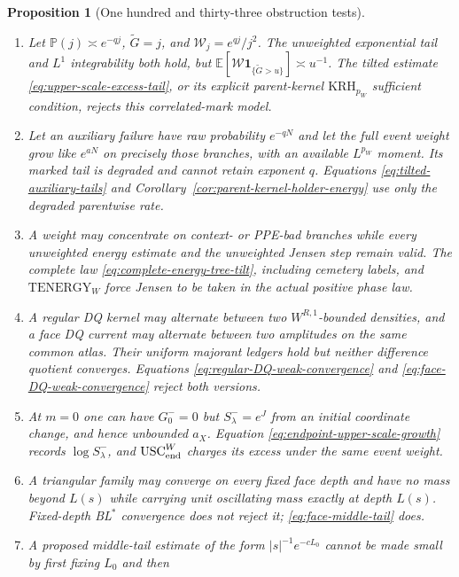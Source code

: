 \documentclass[11pt]{article}
\newtheorem{proposition}[theorem]{Proposition}
\newcommand{\one}{\mathbf 1}
\begin{document}
\begin{proposition}[One hundred and thirty-three obstruction tests]
\begin{enumerate}[label=\textup{(T\arabic*)}]
      minimum \eqref{eq:complete-phase-exponent} return the correct smaller
      exponent without applying a second square root.
\item Let $\mathbb P(j)\asymp e^{-qj}$,
      $\widetilde G=j$, and $\mathscr W_j=e^{qj}/j^2$.  The unweighted
      exponential tail and $L^1$ integrability both hold, but
      $\mathbb E[\mathscr W\one_{\{\widetilde G>u\}}]\asymp u^{-1}$.
      The tilted estimate \eqref{eq:upper-scale-excess-tail}, or its explicit
      parent-kernel $\mathrm{KRH}_{p_W}$ sufficient condition, rejects this
      correlated-mark model.
\item Let an auxiliary failure have raw probability $e^{-qN}$ and let the
      full event weight grow like $e^{aN}$ on precisely those branches, with
      an available $L^{p_W}$ moment.  Its marked tail is degraded and cannot
      retain exponent $q$.  Equations
      \eqref{eq:tilted-auxiliary-tails} and
      Corollary~\ref{cor:parent-kernel-holder-energy} use only the degraded
      parentwise rate.
\item A weight may concentrate on context- or PPE-bad branches while every
      unweighted energy estimate and the unweighted Jensen step remain
      valid.  The complete law \eqref{eq:complete-energy-tree-tilt}, including
      cemetery labels, and $\mathrm{TENERGY}_{W}$ force Jensen to be taken in
      the actual positive phase law.
\item A regular DQ kernel may alternate between two
      $W^{R,1}$-bounded densities, and a face DQ current may alternate between
      two amplitudes on the same common atlas.  Their uniform majorant ledgers
      hold but neither difference quotient converges.  Equations
      \eqref{eq:regular-DQ-weak-convergence} and
      \eqref{eq:face-DQ-weak-convergence} reject both versions.
\item At $m=0$ one can have $G_0^-=0$ but
      $S_\lambda^-=e^J$ from an initial coordinate change, and hence
      unbounded $a_X$.  Equation \eqref{eq:endpoint-upper-scale-growth} records
      $\log S_\lambda^-$, and $\mathrm{USC}_{\rm end}^{W}$ charges its excess
      under the same event weight.
\item A triangular family may converge on every fixed face depth and have
      no mass beyond $L(s)$ while carrying unit oscillating mass exactly at
      depth $L(s)$.  Fixed-depth BL$^*$ convergence does not reject it;
      \eqref{eq:face-middle-tail} does.
\item A proposed middle-tail estimate of the form
      $|s|^{-1}e^{-cL_0}$ cannot be made small by first fixing $L_0$ and then

\end{enumerate}
\end{proposition}
\end{document}
